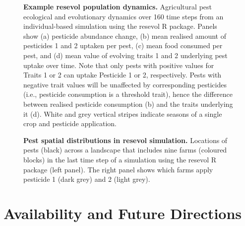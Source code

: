 \documentclass[10pt,letterpaper]{article}
\begin{document}
\begin{figure}[!h]
\caption{{\bf Example resevol population dynamics.}
Agricultural pest ecological and evolutionary dynamics over 160 time steps from an individual-based simulation using the resevol R package. Panels show (a) pesticide abundance change, (b) mean realised amount of pesticides 1 and 2 uptaken per pest, (c) mean food consumed per pest, and (d) mean value of evolving traits 1 and 2 underlying pest uptake over time. Note that only pests with positive values for Traits 1 or 2 can uptake Pesticide 1 or 2, respectively. Pests with negative trait values will be unaffected by corresponding pesticides (i.e., pesticide consumption is a threshold trait), hence the difference between realised pesticide consumption (b) and the traits underlying it (d). White and grey vertical stripes indicate seasons of a single crop and pesticide application.}
\label{fig:overtime}
\end{figure}

\begin{figure}[!h]
\caption{{\bf Pest spatial distributions in resevol simulation.}
Locations of pests (black) across a landscape that includes nine farms (coloured blocks) in the last time step of a simulation using the resevol R package (left panel). The right panel shows which farms apply pesticide 1 (dark grey) and 2 (light grey).}
\label{fig:landscape}
\end{figure}

\hypertarget{conclusions}{%
\section{Availability and Future Directions}\label{conclusions}}
\end{document}
